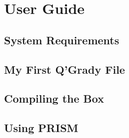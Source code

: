 \documentclass[report.tex]{subfiles}
\begin{document}
\chapter{User Guide} %
\label{cha:user_guide}
\section{System Requirements} %
\label{sec:system_requirements}


\section{My First Q'Grady File} %
\label{sec:my_first_q_grady_file}


\section{Compiling the Box} %
\label{sec:compiling_the_box}


\section{Using PRISM} %
\label{sec:using_prism}


\newpage
\end{document}
